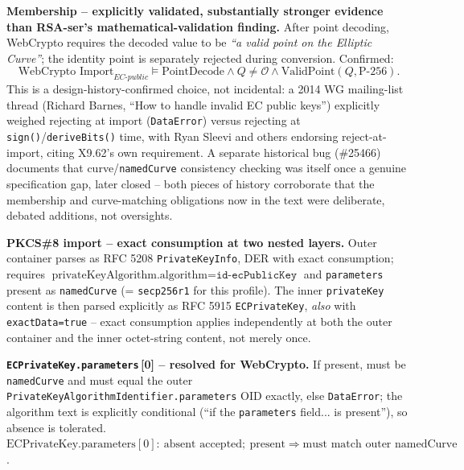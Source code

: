 \documentclass[11pt,a4paper]{article}
\begin{document}
\textbf{Membership -- explicitly validated, substantially stronger evidence than RSA-ser's mathematical-validation finding.} After point decoding, WebCrypto requires the decoded value to be \emph{``a valid point on the Elliptic Curve''}; the identity point is separately rejected during conversion. Confirmed:
\[
\text{WebCrypto Import}_{EC\text{-}public} \models \text{PointDecode} \wedge Q\neq\mathcal{O} \wedge \text{ValidPoint}(Q,\text{P-256}).
\]
This is a design-history-confirmed choice, not incidental: a 2014 WG mailing-list thread (Richard Barnes, ``How to handle invalid EC public keys'') explicitly weighed rejecting at import (\texttt{DataError}) versus rejecting at \texttt{sign()}/\texttt{deriveBits()} time, with Ryan Sleevi and others endorsing reject-at-import, citing X9.62's own requirement. A separate historical bug (\#25466) documents that curve/\texttt{namedCurve} consistency checking was itself once a genuine specification gap, later closed -- both pieces of history corroborate that the membership and curve-matching obligations now in the text were deliberate, debated additions, not oversights.

\textbf{PKCS\#8 import -- exact consumption at two nested layers.} Outer container parses as RFC 5208 \texttt{PrivateKeyInfo}, DER with exact consumption; requires $\text{privateKeyAlgorithm.algorithm}=\texttt{id-ecPublicKey}$ and \texttt{parameters} present as \texttt{namedCurve} (= \texttt{secp256r1} for this profile). The inner \texttt{privateKey} content is then parsed explicitly as RFC 5915 \texttt{ECPrivateKey}, \emph{also} with \texttt{exactData=true} -- exact consumption applies independently at both the outer container and the inner octet-string content, not merely once.

\textbf{\texttt{ECPrivateKey.parameters}\,[0] -- resolved for WebCrypto.} If present, must be \texttt{namedCurve} and must equal the outer \texttt{PrivateKeyAlgorithmIdentifier.parameters} OID exactly, else \texttt{DataError}; the algorithm text is explicitly conditional (``if the \texttt{parameters} field... is present''), so absence is tolerated. $\text{ECPrivateKey.parameters}[0]:\ \text{absent accepted}; \ \text{present} \Rightarrow \text{must match outer namedCurve}$.
\end{document}
